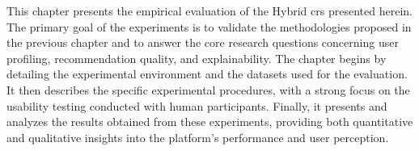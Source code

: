 This chapter presents the empirical evaluation of the Hybrid \acl{crs} presented herein. The primary goal of the experiments is to validate the methodologies proposed in the previous chapter and to answer the core research questions concerning user profiling, recommendation quality, and explainability. The chapter begins by detailing the experimental environment and the datasets used for the evaluation. It then describes the specific experimental procedures, with a strong focus on the usability testing conducted with human participants. Finally, it presents and analyzes the results obtained from these experiments, providing both quantitative and qualitative insights into the platform's performance and user perception.